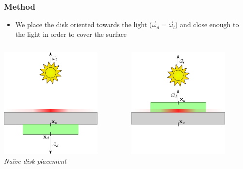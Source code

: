 \documentclass{beamer}
\newcommand{\vomega}{\vec{\omega}}
\begin{document}
\begin{frame}
    \frametitle{Method}
			\begin{itemize}
			\item We place the disk oriented towards the light ($\vomega_d = \vomega_l$) and close enough to the light in order to cover the surface
			\end{itemize}
			\vspace{0.2cm}
			\begin{columns}
    \begin{column}{0.5\textwidth}
      \centering
		\includegraphics[width=0.8\textwidth]{distribution_wrong_1}
		\\\textit{Naïve disk placement}
				\end{column}
    \begin{column}{0.5\textwidth}
      \centering
		\includegraphics[width=0.8\textwidth]{distribution_wrong_2}

\end{column}
\end{columns}
\end{frame}
\end{document}
